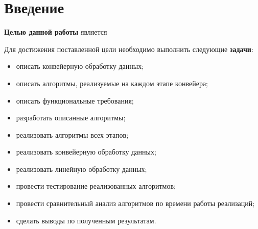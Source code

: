 \chapter*{Введение}

\textbf{Целью данной работы} является

Для достижения поставленной цели необходимо выполнить следующие
\textbf{задачи}:
\begin{itemize}[left=\parindent]
    \item описать конвейерную обработку данных;
    \item описать алгоритмы, реализуемые на каждом этапе конвейера;
    \item описать функциональные требования;
    \item разработать описанные алгоритмы;
    \item реализовать алгоритмы всех этапов;
    \item реализовать конвейерную обработку данных;
    \item реализовать линейную обработку данных;
    \item провести тестирование реализованных алгоритмов;
    \item провести сравнительный анализ алгоритмов по времени работы
          реализаций;
    \item сделать выводы по полученным результатам.
\end{itemize}
